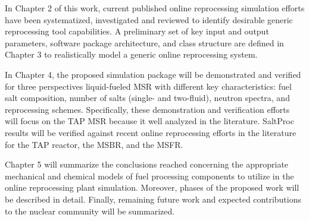 In Chapter 2 of this work, current published online reprocessing 
simulation efforts have been systematized, investigated and 
reviewed to identify desirable generic reprocessing tool capabilities. 
A preliminary set of key input 
and output parameters, software package architecture, and class 
structure are defined in Chapter 3 to realistically model a generic  
online reprocessing system. 

In Chapter 4, the proposed simulation package will be demonstrated and 
verified for three perspectives liquid-fueled \gls{MSR} with different 
key characteristics: fuel salt composition, number of salts (single- 
and two-fluid), neutron spectra, and reprocessing schemes. Specifically, 
these demonstration and verification efforts will focus on the \gls{TAP} 
\gls{MSR} because it well analyzed in the literature. 
SaltProc results will be verified against recent online reprocessing 
efforts in the literature for the \gls{TAP} reactor, the \gls{MSBR}, 
and the \gls{MSFR}. 

Chapter 5 will summarize the conclusions reached concerning the 
appropriate mechanical and chemical models of fuel processing 
components to utilize in the online reprocessing plant simulation. 
Moreover, phases of the proposed work will be described in detail. 
Finally, remaining future work and expected contributions to the 
nuclear community will be summarized.